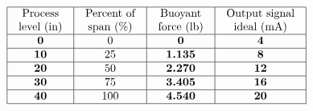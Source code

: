 

$$\vbox{\offinterlineskip
\halign{\strut
\vrule \quad\hfil # \ \hfil & 
\vrule \quad\hfil # \ \hfil & 
\vrule \quad\hfil # \ \hfil & 
\vrule \quad\hfil # \ \hfil \vrule \cr
\noalign{\hrule}
%
Process & Percent of & Buoyant & Output signal \cr
%
level (in) & span (\%) & force (lb) & ideal (mA) \cr
%
\noalign{\hrule}
%
{\bf 0} & 0 & {\bf 0} & {\bf 4} \cr
%
\noalign{\hrule}
%
{\bf 10} & 25 & {\bf 1.135} & {\bf 8} \cr
%
\noalign{\hrule}
%
{\bf 20} & 50 & {\bf 2.270} & {\bf 12} \cr
%
\noalign{\hrule}
%
{\bf 30} & 75 & {\bf 3.405} & {\bf 16} \cr
%
\noalign{\hrule}
%
{\bf 40} & 100 & {\bf 4.540} & {\bf 20} \cr
%
\noalign{\hrule}
} %
}$$ %











